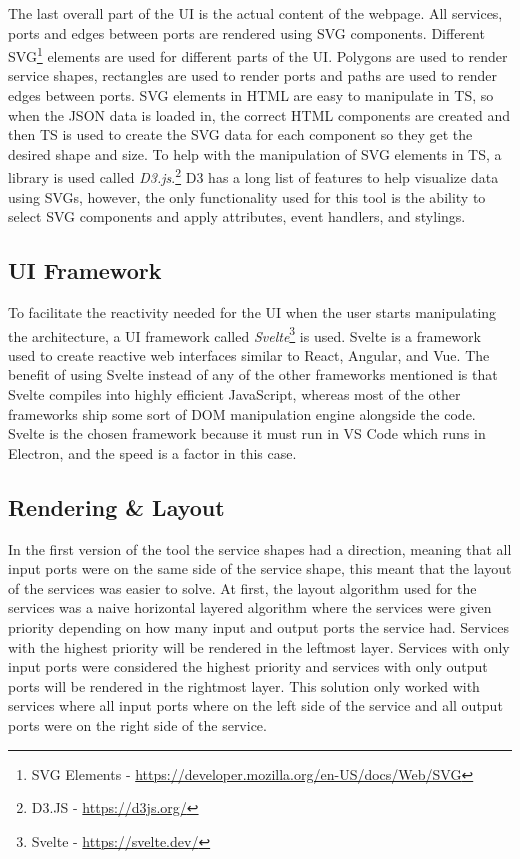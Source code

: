 The last overall part of the UI is the actual content of the webpage. All services, ports and edges between ports are rendered using SVG components.
Different SVG\footnote{SVG Elements - \url{https://developer.mozilla.org/en-US/docs/Web/SVG}} elements are used for different parts of the UI. Polygons are used to render service shapes, rectangles are used to render ports and paths are used to render edges between ports.
SVG elements in HTML are easy to manipulate in TS, so when the JSON data is loaded in, the correct HTML components are created and then TS is used to create the SVG data for each component so they get the desired shape and size.
To help with the manipulation of SVG elements in TS, a library is used called \textit{D3.js}.\footnote{D3.JS - \url{https://d3js.org/}} D3 has a long list of features to help visualize data using SVGs, however, the only functionality used for this tool is
the ability to select SVG components and apply attributes, event handlers, and stylings.

\subsection{UI Framework}
To facilitate the reactivity needed for the UI when the user starts manipulating the architecture, a UI framework called \textit{Svelte}\footnote{Svelte - \url{https://svelte.dev/}} is used.
Svelte is a framework used to create reactive web interfaces similar to React, Angular, and Vue. The benefit of using Svelte instead of any of the other frameworks mentioned is that Svelte compiles into highly efficient JavaScript,
whereas most of the other frameworks ship some sort of DOM manipulation engine alongside the code. Svelte is the chosen framework because it must run in VS Code which runs in Electron, and the speed is a factor in this case.

\subsection{Rendering \& Layout}

In the first version of the tool the service shapes had a direction, meaning that all input ports were on the same side of the service shape, this meant that the layout of the services was easier to solve.
At first, the layout algorithm used for the services was a naive horizontal layered algorithm where the services were given priority depending on how many input and output ports the service had.
Services with the highest priority will be rendered in the leftmost layer. Services with only input ports were considered the highest priority and services with only output ports will be rendered in the rightmost layer.
This solution only worked with services where all input ports where on the left side of the service and all output ports were on the right side of the service.

